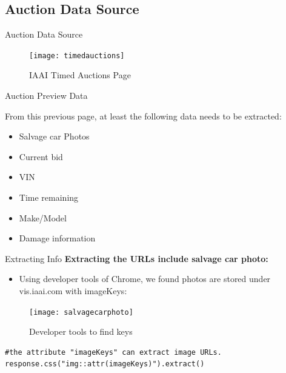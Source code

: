 \documentclass{beamer}
\begin{document}
\subsection{Auction Data Source}
\begin{frame}{Auction Data Source}

\begin{figure}[ht]
\centering
\texttt{[image: timedauctions]}
\caption{IAAI Timed Auctions Page}
\label{fig:auction}
\end{figure}

\end{frame}

\begin{frame}{Auction Preview Data}

From this previous page, at least the following data needs to be extracted:

\begin{itemize}
\setlength\itemsep{1em}
\item Salvage car Photos\\
\item Current bid\\
\item VIN\\
\item Time remaining\\
\item Make/Model\\
\item Damage information\\
\end{itemize}

\end{frame}

\begin{frame}[fragile=singleslide]{Extracting Info}
\textbf{Extracting the URLs include salvage car photo:}
\begin{itemize}
    \item Using developer tools of Chrome, we found photos are stored under vis.iaai.com with imageKeys:
\end{itemize}
\begin{figure}[ht]
\centering
\texttt{[image: salvagecarphoto]}
\caption{Developer tools to find keys}
\label{fig:salvage}
\end{figure}
\begin{verbatim}
#the attribute "imageKeys" can extract image URLs. 
response.css("img::attr(imageKeys)").extract()
\end{verbatim}
\end{frame}
\end{document}
